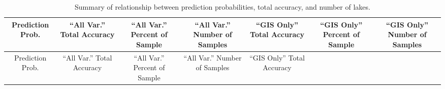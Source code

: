 \documentclass[11pt,]{article}
\begin{document}
\newpage

\begin{longtable}[c]{@{}ccccccc@{}}
\caption{Summary of relationship between prediction probabilities, total
accuracy, and number of lakes. \label{tab:cond_prob_tab}}\tabularnewline
\toprule
\begin{minipage}[b]{0.08\columnwidth}\centering\strut
Prediction Prob.
\strut\end{minipage} &
\begin{minipage}[b]{0.11\columnwidth}\centering\strut
``All Var.'' Total Accuracy
\strut\end{minipage} &
\begin{minipage}[b]{0.13\columnwidth}\centering\strut
``All Var.'' Percent of Sample
\strut\end{minipage} &
\begin{minipage}[b]{0.13\columnwidth}\centering\strut
``All Var.'' Number of Samples
\strut\end{minipage} &
\begin{minipage}[b]{0.11\columnwidth}\centering\strut
``GIS Only'' Total Accuracy
\strut\end{minipage} &
\begin{minipage}[b]{0.13\columnwidth}\centering\strut
``GIS Only'' Percent of Sample
\strut\end{minipage} &
\begin{minipage}[b]{0.13\columnwidth}\centering\strut
``GIS Only'' Number of Samples
\strut\end{minipage}\tabularnewline
\midrule
\endfirsthead
\toprule
\begin{minipage}[b]{0.08\columnwidth}\centering\strut
Prediction Prob.
\strut\end{minipage} &
\begin{minipage}[b]{0.11\columnwidth}\centering\strut
``All Var.'' Total Accuracy
\strut\end{minipage} &
\begin{minipage}[b]{0.13\columnwidth}\centering\strut
``All Var.'' Percent of Sample
\strut\end{minipage} &
\begin{minipage}[b]{0.13\columnwidth}\centering\strut
``All Var.'' Number of Samples
\strut\end{minipage} &
\begin{minipage}[b]{0.11\columnwidth}\centering\strut
``GIS Only'' Total Accuracy
\strut\end{minipage} &
\begin{minipage}[b]{0.13\columnwidth}\centering\strut

\end{minipage}
\end{longtable}
\end{document}
